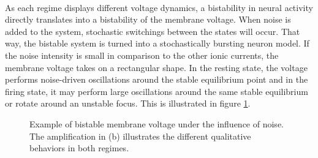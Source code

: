 \documentclass[12pt,a4paper]{article}
\begin{document}
\\
As each regime displays different voltage dynamics, a bistability in neural activity directly translates into a bistability of the membrane voltage. When noise is added to the system, stochastic switchings between the states will occur. That way, the bistable system is turned into a stochastically bursting neuron model. If the noise intensity is small in comparison to the other ionic currents, the membrane voltage takes on a rectangular shape. In the resting state, the voltage performs noise-driven oscillations around the stable equilibrium point and in the firing state, it may perform large oscillations around the same stable equilibrium or rotate around an unstable focus. This is illustrated in figure \ref{bistablevolt}. 

\begin{figure}[H]		 
	\caption{Example of bistable membrane voltage under the influence of noise. The amplification in (b) illustrates the different qualitative behaviors in both regimes.}
	\label{bistablevolt} 
\end{figure}
\end{document}
